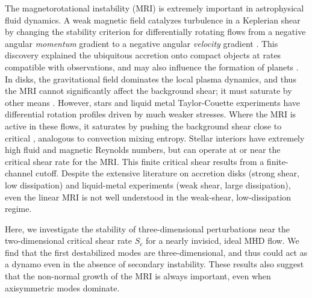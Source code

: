 \documentclass[aps,prl,reprint,superscriptaddress]{revtex4-1}
\begin{document}
\pacs{}
\maketitle

The magnetorotational instability (MRI) is extremely important in astrophysical fluid dynamics.
A weak magnetic field catalyzes turbulence in a Keplerian shear by changing the stability criterion for differentially rotating flows from a negative angular \emph{momentum} gradient to a negative angular \emph{velocity} gradient \citep[e.g.][]{1998RvMP...70....1B,2010RSPTA.368.1607J}.
This discovery explained the ubiquitous accretion onto compact objects at rates compatible with observations, and may also influence the formation of planets \citep[e.g.][]{2007Natur.448.1022J}.
In disks, the gravitational field dominates the local plasma dynamics, and thus the MRI cannot significantly affect the background shear; it must saturate by other means \citep{2018MNRAS.474.3451X}.
However, stars and liquid metal Taylor-Couette experiments have differential rotation profiles driven by much weaker stresses.
Where the MRI is active in these flows, it saturates by pushing the background shear close to critical \citep{2015RSPSA.47140699V,2017ApJ...841....1C,2017ApJ...841....2C}, analogous to convection mixing entropy.
Stellar interiors have extremely high fluid and magnetic Reynolds numbers, but can operate at or near the critical shear rate for the MRI.
This finite critical shear results from a finite-channel cutoff.
Despite the extensive literature on accretion disks (strong shear, low dissipation) and liquid-metal experiments (weak shear, large dissipation), even the linear MRI is not well understood in the weak-shear, low-dissipation regime. 

Here, we investigate the stability of three-dimensional perturbations near the two-dimensional critical shear rate $S_{c}$ for a nearly invisicd, ideal MHD flow.
We find that the first destabilized modes are three-dimensional, and thus could act as a dynamo even in the absence of secondary instability.
These results also suggest that the non-normal growth of the MRI is always important, even when axisymmetric modes dominate.
\end{document}
